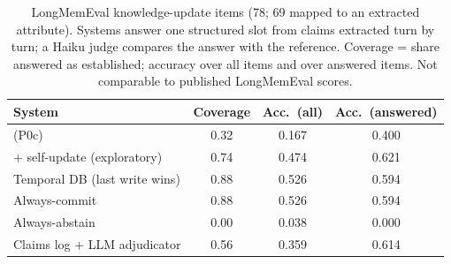 \begin{table}[t]\centering\footnotesize
\caption{LongMemEval knowledge-update items (78; 69 mapped to an extracted attribute). Systems answer one structured slot from claims extracted turn by turn; a Haiku judge compares the answer with the reference. Coverage = share answered as established; accuracy over all items and over answered items. Not comparable to published LongMemEval scores.}\label{tab:lme}
\begin{tabular}{lccc}
\toprule
System & Coverage & Acc.\ (all) & Acc.\ (answered) \\
\midrule
\pal{} (P0c) & 0.32 & 0.167 & 0.400 \\
\pal{} + self-update (exploratory) & 0.74 & 0.474 & 0.621 \\
Temporal DB (last write wins) & 0.88 & 0.526 & 0.594 \\
Always-commit & 0.88 & 0.526 & 0.594 \\
Always-abstain & 0.00 & 0.038 & 0.000 \\
Claims log + LLM adjudicator & 0.56 & 0.359 & 0.614 \\
\bottomrule
\end{tabular}
\end{table}
